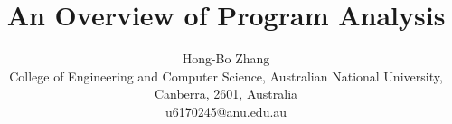 \documentclass[11pt,note]{HONGBOANU}
\title{An Overview of Program Analysis }
\author{Hong-Bo Zhang\\
College of Engineering and Computer Science, Australian National University, Canberra, 2601, Australia\\
u6170245@anu.edu.au}
\begin{document}
\newpage




\acknowledgments

\appendix


\begin{thebibliography}{999}
\end{thebibliography}
\end{document}
